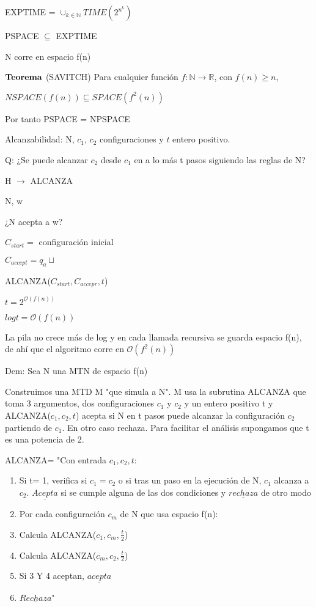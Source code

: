 \documentclass{homework}
\begin{document}
EXPTIME = $\cup_{k \in \mathds{N}} TIME (2^{n^k})$

PSPACE $\subseteq$ EXPTIME

N corre en espacio f(n)

$\bf{Teorema}$ (SAVITCH) Para cualquier función  $f: \mathds{N} \to \mathds{R}$, con $f(n) \geq n$,

$NSPACE(f(n)) \subseteq SPACE(f^2(n))$

Por tanto PSPACE = NPSPACE

Alcanzabilidad: N, $c_1$, $c_2$ configuraciones y $t$ entero positivo.

Q: ¿Se puede alcanzar $c_2$ desde $c_1$ en a lo más t pasos siguiendo las reglas de N?

H $\to$ ALCANZA

N, w

¿N acepta a w?

$C_{start} =$ configuración inicial

$C_{accept} = q_a \sqcup$

ALCANZA($C_{start}, C_{accepr}, t$)

$t = 2^{\mathcal{O}(f(n))}$

$log t = \mathcal{O}(f(n))$

La pila no crece más de log y en cada llamada recursiva se guarda espacio f(n), de ahí que el algoritmo corre en $\mathcal{O}(f^2(n))$


Dem: Sea N una MTN de espacio f(n)

Construimos una MTD M "que simula a N". M usa la subrutina ALCANZA que toma 3 argumentos, dos configuraciones $c_1$ y $c_2$ y un entero positivo t y ALCANZA($c_1,c_2,t$) acepta si N en t pasos puede alcanzar la configuración $c_2$ partiendo de $c_1$. En otro caso rechaza. Para facilitar el análisis supongamos que t es una potencia de 2.

ALCANZA= "Con entrada $c_1, c_2,t$:
\begin{enumerate}
	\item Si t= 1, verifica si $c_1 = c_2$ o si tras un paso en la ejecución de N, $c_1$ alcanza a $c_2$. $\underline{Acepta}$ si se cumple alguna de las dos condiciones y $\underline{rechaza}$ de otro modo
	\item Por cada configuración $c_m$ de N que usa espacio f(n):
	\item   Calcula ALCANZA($c_1,c_m,\frac{t}{2}$)
	\item   Calcula ALCANZA($c_m,c_2,\frac{t}{2}$)
	\item   Si 3 Y 4 aceptan, $\underline{acepta}$
	\item $\underline{Rechaza}$"
\end{enumerate}
\end{document}
